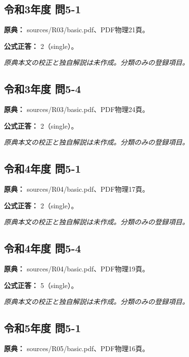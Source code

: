 \subsection{令和3年度 問5-1}
\label{q:r03-reg-basic-5-1}

\noindent\textbf{原典：} sources/R03/basic.pdf、PDF物理21頁。

\textbf{公式正答：} 2（single）。

\par\textit{原典本文の校正と独自解説は未作成。分類のみの登録項目。}

\subsection{令和3年度 問5-4}
\label{q:r03-reg-basic-5-4}

\noindent\textbf{原典：} sources/R03/basic.pdf、PDF物理24頁。

\textbf{公式正答：} 2（single）。

\par\textit{原典本文の校正と独自解説は未作成。分類のみの登録項目。}

\subsection{令和4年度 問5-1}
\label{q:r04-reg-basic-5-1}

\noindent\textbf{原典：} sources/R04/basic.pdf、PDF物理17頁。

\textbf{公式正答：} 2（single）。

\par\textit{原典本文の校正と独自解説は未作成。分類のみの登録項目。}

\subsection{令和4年度 問5-4}
\label{q:r04-reg-basic-5-4}

\noindent\textbf{原典：} sources/R04/basic.pdf、PDF物理19頁。

\textbf{公式正答：} 5（single）。

\par\textit{原典本文の校正と独自解説は未作成。分類のみの登録項目。}

\subsection{令和5年度 問5-1}
\label{q:r05-reg-basic-5-1}

\noindent\textbf{原典：} sources/R05/basic.pdf、PDF物理16頁。

